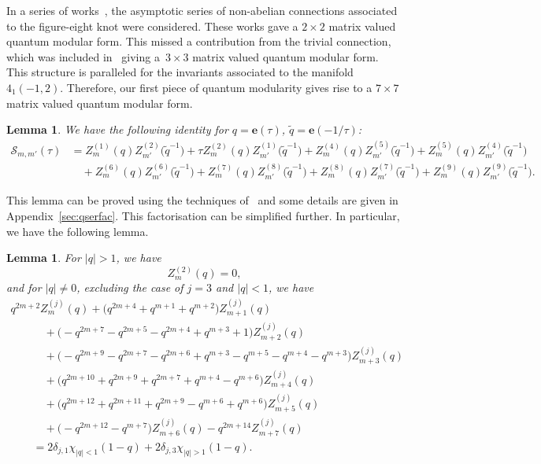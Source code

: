 \documentclass[pdftex]{sigma}
\numberwithin{equation}{section}
\newtheorem{Lemma}[Theorem]{Lemma}
\def\tq{\tilde{q}}
\def\e{\mathbf e}
\def\calS{\mathcal S}
\def\tq{\tilde{q}}
\begin{document}
In a series of works~\cite{GGM:I,GK:qser,GZ:qser}, the asymptotic series of non-abelian connections associated to the figure-eight knot were considered. These works gave a $2\times 2$ matrix valued quantum modular form. This missed a contribution from the trivial connection, which was included in~\cite{GGMW,Wh:thesis} giving a~${3\times 3}$ matrix valued quantum modular form. This structure is paralleled for the invariants associated to the manifold $4_1(-1,2)$. Therefore, our first piece of quantum modularity gives rise to a $7\times 7$ matrix valued quantum modular form.
\begin{Lemma}\label{lem:7x7stateint}
 We have the following identity for $q=\e(\tau)$, $\tq=\e(-1/\tau)$:
 \begin{align*}
 \calS_{m,m'}(\tau)&{}=
 Z_{m}^{(1)}(q)Z_{m'}^{(2)}\bigl(\tq^{-1}\bigr)+\tau Z_{m}^{(2)}(q)Z_{m'}^{(1)}\bigl(\tq^{-1}\bigr)+Z_{m}^{(4)}(q)Z_{m'}^{(5)}\bigl(\tq^{-1}\bigr)+Z_{m}^{(5)}(q)Z_{m'}^{(4)}\bigl(\tq^{-1}\bigr)\\
 &{}\quad\!+Z_{m}^{(6)}(q)Z_{m'}^{(6)}\bigl(\tq^{-1}\bigr)+Z_{m}^{(7)}(q)Z_{m'}^{(8)}\bigl(\tq^{-1}\bigr)+Z_{m}^{(8)}(q)Z_{m'}^{(7)}\bigl(\tq^{-1}\bigr)+Z_{m}^{(9)}(q)Z_{m'}^{(9)}\bigl(\tq^{-1}\bigr) .
 \end{align*}
\end{Lemma}
This lemma can be proved using the techniques of~\cite{GK:qser} and some details are given in Appendix~\ref{sec:qserfac}. This factorisation can be simplified further. In particular, we have the following lemma.
\begin{Lemma}\label{lem:vanishingqseries}
For $|q|>1$, we have
\[
 Z^{(2)}_{m}(q)
  =0 ,
\]
and for $|q|\neq0$, excluding the case of $j=3$ and $|q|<1$, we have
\begin{gather}
 q^{2m+2}Z^{(j)}_{m}(q)+\bigl(q^{2m+4}+q^{m+1}+q^{m+2}\bigr)Z^{(j)}_{m+1}(q)\nonumber\\
 \qquad\quad{}+\bigl(-q^{2m+7}-q^{2m+5}-q^{2m+4}+q^{m+3}+1\bigr)Z^{(j)}_{m+2}(q)\nonumber\\
 \qquad\quad{}+\bigl(-q^{2m+9}-q^{2m+7}-q^{2m+6}+q^{m+3}-q^{m+5}-q^{m+4}-q^{m+3}\bigr)Z^{(j)}_{m+3}(q)\nonumber\\
 \qquad\quad{}+\bigl(q^{2m+10}+q^{2m+9}+q^{2m+7}+q^{m+4}-q^{m+6}\bigr)Z^{(j)}_{m+4}(q)\nonumber\\
 \qquad\quad{}+\bigl(q^{2m+12}+q^{2m+11}+q^{2m+9}-q^{m+6}+q^{m+6}\bigr)Z^{(j)}_{m+5}(q)\nonumber\\
 \qquad\quad{}+\bigl(-q^{2m+12}-q^{m+7}\bigr)Z^{(j)}_{m+6}(q)-q^{2m+14}Z^{(j)}_{m+7}(q)\nonumber\\
 \qquad{}=2\delta_{j,1}\chi_{|q|<1}(1-q)+2\delta_{j,3}\chi_{|q|>1}(1-q) .\label{eq:z.qdif}
\end{gather}
\end{Lemma}
\end{document}
